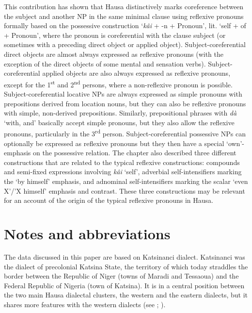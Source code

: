 \documentclass[output=paper]{langscibook}
\begin{document}
This contribution has shown that Hausa distinctively marks coreference between the subject and another NP in the same minimal clause using reflexive pronouns formally based on the possessive construction ‘\textit{kâi} + \nobreakdash-n + Pronoun’, lit. ‘self + of + Pronoun’, where the pronoun is coreferential with the clause subject (or sometimes with a preceding direct object or applied object). Subject-coreferential direct objects are almost always expressed as reflexive pronouns (with the exception of the direct objects of some mental and sensation verbs). Subject-coreferential applied objects are also always expressed as reflexive pronouns, except for the 1\textsuperscript{st} and 2\textsuperscript{nd} persons, where a non-reflexive pronoun is possible. Subject-coreferential locative NPs are always expressed as simple pronouns with prepositions derived from location nouns, but they can also be reflexive pronouns with simple, non-derived prepositions. Similarly, prepositional phrases with \textit{dà} ‘with, and’ basically accept simple pronouns,  but they also allow the reflexive pronouns, particularly in the 3\textsuperscript{rd} person. Subject-coreferential possessive NPs can optionally be expressed as reflexive pronouns but they then have a special ‘own’-emphasis on the possessive relation. The chapter also described three different constructions that are related to the typical reflexive constructions: compounds and semi-fixed expressions involving \textit{kâi} ‘self’, adverbial self-intensifiers marking the ‘by himself’ emphasis, and adnominal self-intensifiers marking the scalar ‘even X’/’X himself’ emphasis and contrast. These three constructions may be relevant for an account of the origin of the typical reflexive pronouns in Hausa.

\section*{Notes and abbreviations}

The data discussed in this paper are based on Katsinanci dialect. Katsinanci was the dialect of precolonial Katsina State, the territory of which today straddles the border between the Republic of Niger (towns of Maradi and Tessaoua) and the Federal Republic of Nigeria (town of Katsina). It is in a central position between the two main Hausa dialectal clusters, the western and the eastern dialects, but it shares more features with the western dialects (see \citealt[7]{Wolff1993}; \citealt[1]{Newman2000}). 
\end{document}
